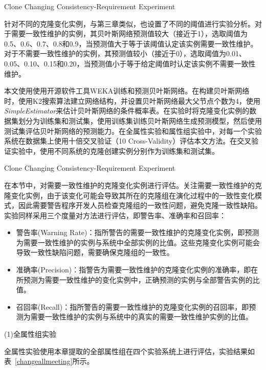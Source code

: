 {Clone Changing Consistency-Requirement Experiment}

针对不同的克隆变化实例，与第三章类似，也设置了不同的阈值进行实验分析。对于需要一致性维护的实例，其贝叶斯网络预测值较大（接近于1），选取阈值为0.5、0.6、0.7、0.8和0.9，当预测值大于等于该阈值认定该实例需要一致性维护。对于不需要一致性维护的实例，其预测值较小（接近于0），选取阈值为0.01、0.05、0.10、0.15和0.20，当预测值小于等于给定阈值时认定该实例不需要一致性维护。

本文使用使用开源软件工具WEKA训练和预测贝叶斯网络。在构建贝叶斯网络时，使用K2搜索算法\cite{}建立网络结构，并设置贝叶斯网络最大父节点个数为4，使用{\em  SimpleEstimator}来估计贝叶斯网络的条件概率表。在实验时将克隆变化实例的数据集划分为训练集和测试集，使用训练集训练贝叶斯网络生成预测模型，然后使用测试集评估贝叶斯网络的预测能力。在全属性实验和属性组实验中，对每一个实验系统在数据集上使用十倍交叉验证（10 Cross-Validity\cite{}）评估本文方法。在交叉验证实验中，使用不同系统的克隆创建实例分别作为训练集和测试集。

{Clone Changing Consistency-Requirement Experiment}

在本节中，对需要一致性维护的克隆变化实例进行评估。关注需要一致性维护的克隆变化实例，由于该变化可能会导致其所在的克隆组在演化过程中的一致性变化模式，因此需要警告程序开发人员检查克隆组的一致性问题，避免克隆一致性缺陷。实验同样采用三个度量对方法进行评估，即警告率、准确率和召回率：

\begin{itemize}
\item 
警告率(Warning Rate)：指所警告的需要一致性维护的克隆变化实例，即预测为需要一致性维护的实例与系统中全部实例的比值。这些克隆变化实例可能会导致一致性缺陷问题，需要确保克隆组的一致性。

\item 
准确率(Precision)：指警告为需要一致性维护的克隆变化实例的准确率，即在所预测为需要一致性维护的变化实例中，正确预测的实例与全部警告实例的比值。

\item 
召回率(Recall)：指所警告的需要一致性维护的克隆变化实例的召回率，即预测为需要一致性维护的实例与系统中的真实的需要一致性维护实例的比值。
\end{itemize}


(1)全属性组实验

全属性实验使用本章提取的全部属性组在四个实验系统上进行评估，实验结果如表~\ref{changeallmeeting}所示。

